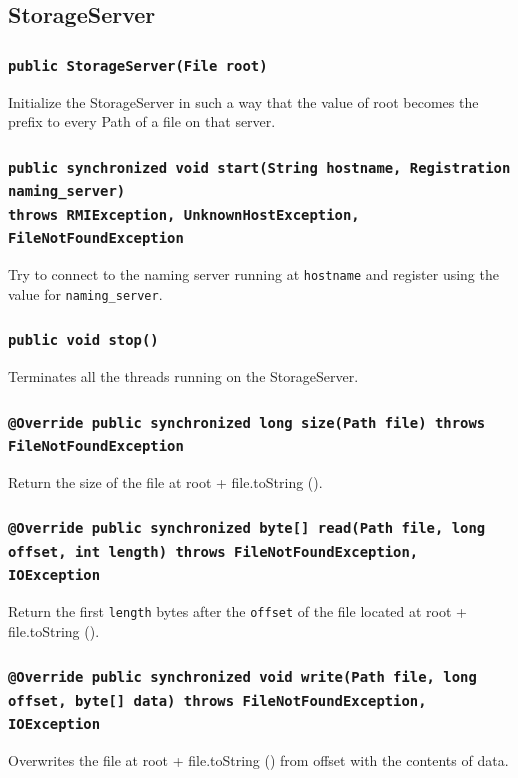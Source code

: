 \documentclass [10pt, a4paper]{article}
\begin{document}
\subsection {StorageServer}

\subsubsection{\texttt{public StorageServer(File root)}}
Initialize the StorageServer in such a way that the value of root becomes the
prefix to every Path of a file on that server.

\subsubsection{\texttt{public synchronized void start(String hostname,
Registration naming\_server)\\ throws RMIException, UnknownHostException,
FileNotFoundException}}
Try to connect to the naming server running at \texttt{hostname} and register
using the value for \texttt{naming\_server}.

\subsubsection{\texttt{public void stop()}}
Terminates all the threads running on the StorageServer.

\subsubsection{\texttt{@Override public synchronized long size(Path file) throws
FileNotFoundException}}
Return the size of the file at root + file.toString ().

\subsubsection{\texttt{@Override public synchronized byte[] read(Path file, long
offset, int length) throws FileNotFoundException, IOException}}
Return the first \texttt{length} bytes after the \texttt{offset} of the file
located at root + file.toString ().

\subsubsection{\texttt{@Override public synchronized void write(Path file, long
offset, byte[] data) throws FileNotFoundException, IOException}}
Overwrites the file at root + file.toString () from offset with the contents of
data.
\end{document}
